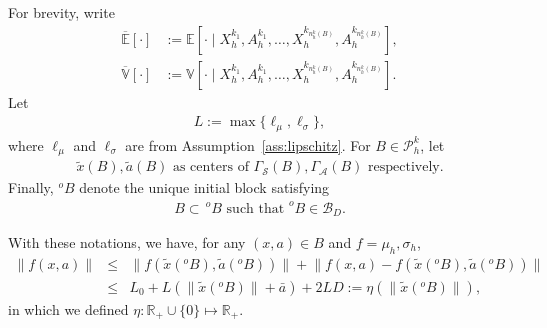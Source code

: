 \documentclass[final,supplement]{siamart251216}
\begin{document}
 
For brevity, write
\begin{align*}
 \overline{\mathbb E}[\cdot]&:=\mathbb E[\cdot\mid X_h^{k_1},A_h^{k_1},\ldots,X_h^{k_{n_h^k(B)}},A_h^{k_{n_h^k(B)}}],\\
 \overline{\mathbb V}[\cdot]&:=\mathbb V[\cdot\mid X_h^{k_1},A_h^{k_1},\ldots,X_h^{k_{n_h^k(B)}},A_h^{k_{n_h^k(B)}}].
\end{align*}
Let
\begin{eqnarray}\label{eq:L}
    L:=\max\{\ell_{\mu},\ell_{\sigma}\},
\end{eqnarray}
where $\ell_\mu$ and $\ell_\sigma$ are from Assumption~\ref{ass:lipschitz}. For $B\in\mathcal P_h^k$, let
\begin{eqnarray}\label{eq:center definition}
   \mbox{$\tilde{x}(B),\tilde{a}(B)$ as centers of $\Gamma_{\mathcal{S}}(B),\Gamma_{\mathcal{A}}(B)$ respectively.}
\end{eqnarray}
Finally, $^{o}B$  denote the unique initial block satisfying
\begin{eqnarray}
    \label{eq:oB definition}
    B\subset \, ^{o}B \mbox{  such that } ^{o}B \in \mathcal{B}_{D}.
\end{eqnarray}


With these notations, we have, for any $(x,a)\in B$ and $f=\mu_{h},\sigma_{h}$,
{\small
    \begin{eqnarray}
        \|f(x,a)\|&\leq& \Big\|f(\tilde{x}(^{o}B),\tilde{a}(^{o}B))\Big\|+\Big\|f(x,a)-f(\tilde{x}(^{o}B),\tilde{a}(^{o}B))\Big\|\nonumber\\
        &\leq& L_{0}+L(\|\tilde{x}(^{o}B)\|+\bar{a})+2LD:=\eta (\|\tilde{x}(^{o}B)\|),\label{eq:Lip-bound}\label{eq:eta function}
    \end{eqnarray}
}
    in which we defined $\eta: \mathbb{R}_+\cup\{0\}\mapsto \mathbb{R}_+$.
\end{document}
